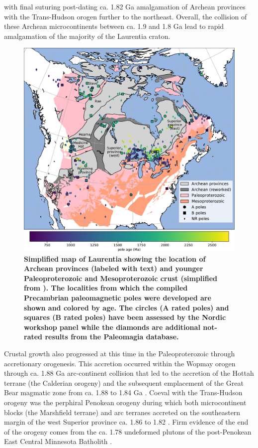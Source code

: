 \documentclass[11pt,letterpaper]{article}
\begin{document}
with final suturing post-dating ca. 1.82 Ga amalgamation of Archean provinces with the Trans-Hudson orogen further to the northeast. Overall, the collision of these Archean microcontinents between ca. 1.9 and 1.8 Ga lead to rapid amalgamation of the majority of the Laurentia craton.

\begin{figure}
\centering
\includegraphics[width=\textwidth]{../Figures/Fig1_map.pdf}
\caption{\small{\textbf{Simplified map of Laurentia showing the location of Archean provinces (labeled with text) and younger Paleoproterozoic and Mesoproterozoic crust (simplified from \citealp{Whitmeyer2007a}). The localities from which the compiled Precambrian paleomagnetic poles were developed are shown and colored by age. The circles (A rated poles) and squares (B rated poles) have been assessed by the Nordic workshop panel while the diamonds are additional not-rated results from the Paleomagia database.}}}
\label{fig:Laurentia_map}
\end{figure} 

Crustal growth also progressed at this time in the Paleoproterozoic through accretionary orogenesis. This accretion occurred within the Wopmay orogen through ca. 1.88 Ga arc-continent collision that led to the accretion of the Hottah terrane (the Calderian orogeny) and the subsequent emplacement of the Great Bear magmatic zone from ca. 1.88 to 1.84 Ga \citep{Hildebrand2009a}. Coeval with the Trans-Hudson orogeny was the perphiral Penokean orogeny during which both microcontinent blocks (the Marshfield terrane) and arc terranes accreted on the southeastern margin of the west Superior province ca. 1.86 to 1.82 \cite{Schulz2007a}. Firm evidence of the end of the orogeny comes from the ca. 1.78 undeformed plutons of the post-Penokean East Central Minnesota Batholith \citep{Holm2005a}. 
\end{document}
